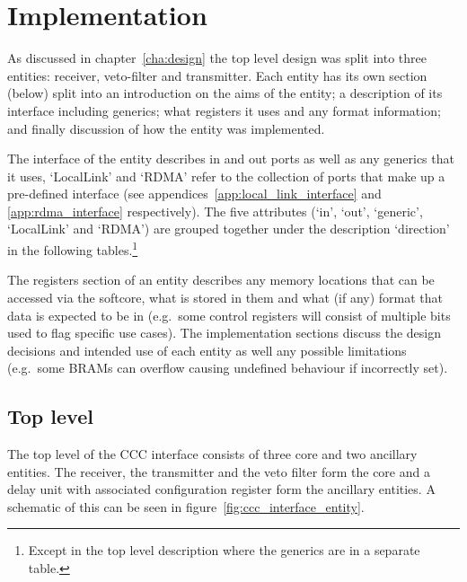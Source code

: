 \chapter{Implementation} %
\label{cha:implementation}
As discussed in chapter~\ref{cha:design} the top level design was split into three entities: receiver, veto-filter and transmitter. Each entity has its own section (below) split into an introduction on the aims of the entity; a description of its interface including generics; what registers it uses and any format information; and finally discussion of how the entity was implemented. 

The interface of the entity describes in and out ports as well as any generics that it uses, `LocalLink' and `RDMA' refer to the collection of ports that make up a pre-defined interface (see appendices~\ref{app:local_link_interface} and \ref{app:rdma_interface} respectively). The five attributes (`in', `out', `generic', `LocalLink' and `RDMA') are grouped together under the description `direction' in the following tables.\footnote{Except in the top level description where the generics are in a separate table.}

The registers section of an entity describes any memory locations that can be accessed via the softcore, what is stored in them and what (if any) format that data is expected to be in (e.g.\ some control registers will consist of multiple bits used to flag specific use cases). The implementation sections discuss the design decisions and intended use of each entity as well any possible limitations (e.g.\ some BRAMs can overflow causing undefined behaviour if incorrectly set).

\section{Top level} %
\label{sec:top_level}
The top level of the CCC interface consists of three core and two ancillary entities. The receiver, the transmitter and the veto filter form the core and a delay unit with associated configuration register form the ancillary entities. A schematic of this can be seen in figure~\ref{fig:ccc_interface_entity}. 

